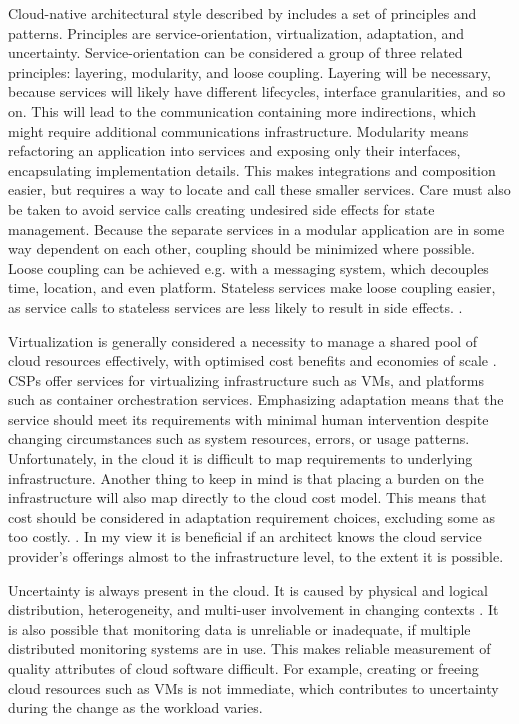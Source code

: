 \documentclass[utf8,english]{gradu3}
\begin{document}
Cloud-native architectural style described by \textcite[5]{Pahl2018} includes a
set of principles and patterns. Principles are service-orientation,
virtualization, adaptation, and uncertainty. Service-orientation can be
considered a group of three related principles: layering, modularity, and loose
coupling. Layering will be necessary, because services will likely have
different lifecycles, interface granularities, and so on. This will lead to the
communication containing more indirections, which might require additional
communications infrastructure. Modularity means refactoring an application into
services and exposing only their interfaces, encapsulating implementation
details. This makes integrations and composition easier, but requires a way to
locate and call these smaller services. Care must also be taken to avoid service
calls creating undesired side effects for state management. Because the separate
services in a modular application are in some way dependent on each other,
coupling should be minimized where possible. Loose coupling can be achieved e.g.
with a messaging system, which decouples time, location, and even platform.
Stateless services make loose coupling easier, as service calls to stateless
services are less likely to result in side effects. \parencite[3-8]{Pahl2018}.

Virtualization is generally considered a necessity to manage a shared pool of
cloud resources effectively, with optimised cost benefits and economies of scale
\parencite[8]{Pahl2018}. CSPs offer services for virtualizing
infrastructure such as VMs, and platforms such as container orchestration services.
Emphasizing adaptation means that the service should meet its requirements with
minimal human intervention despite changing circumstances such as system
resources, errors, or usage patterns. Unfortunately, in the cloud it is
difficult to map requirements to underlying infrastructure. Another thing to
keep in mind is that placing a burden on the infrastructure will also map
directly to the cloud cost model. This means that cost should be considered in
adaptation requirement choices, excluding some as too costly.
\parencite[3-10]{Pahl2018}. In my view it is beneficial if an architect knows
the cloud service provider's offerings almost to the infrastructure level, to
the extent it is possible.

Uncertainty is always present in the cloud. It is caused by physical and logical
distribution, heterogeneity, and multi-user involvement in changing contexts
\parencite[3]{Pahl2018}. It is also possible that monitoring data is unreliable
or inadequate, if multiple distributed monitoring systems are in use. This makes
reliable measurement of quality attributes of cloud software difficult. For
example, creating or freeing cloud resources such as VMs is not
immediate, which contributes to uncertainty during the change as the workload
varies. \parencite[3-11]{Pahl2018}
\end{document}
